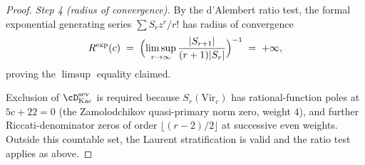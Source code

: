 \begin{proof}
\emph{Step 4 (radius of convergence).} By the d'Alembert ratio test,
the formal exponential generating series
$\sum S_r z^r / r!$ has radius of convergence
\[
 R^{\mathrm{exp}}(c)
 \;=\;
 \Bigl( \limsup_{r \to \infty}
 \frac{\lvert S_{r+1} \rvert}{(r+1) \lvert S_r \rvert}
 \Bigr)^{-1}
 \;=\;
 + \infty,
\]
proving the $\limsup$ equality claimed.

Exclusion of $\cD^{\mathrm{sev}}_{\mathrm{Kac}}$ is required because
$S_r(\mathrm{Vir}_c)$ has rational-function poles at
$5 c + 22 = 0$ (the Zamolodchikov quasi-primary norm zero, weight
$4$), and further Riccati-denominator zeros of order $\lfloor (r-2)/2
\rfloor$ at successive even weights. Outside this countable set, the
Laurent stratification is valid and the ratio test applies as above.
\end{proof}

